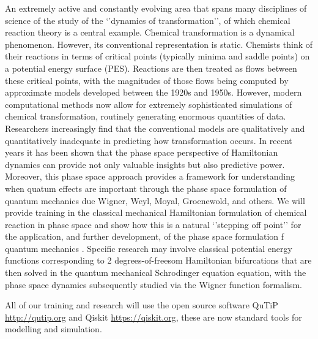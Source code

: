 \documentclass[11pt]{article}
\begin{document}
An extremely active and constantly evolving area that spans many disciplines of science of the study of the ‘’dynamics of transformation’’, of which chemical reaction theory is a central example. Chemical transformation is a dynamical phenomenon.  However, its conventional representation is static.  Chemists think of their reactions in terms of critical points (typically minima and saddle points) on a potential energy surface (PES).  Reactions are then treated as flows between these critical points, with the magnitudes of those flows being computed by approximate models developed between the 1920s and 1950s.  However, modern computational methods now allow for extremely sophisticated simulations of chemical transformation, routinely generating enormous quantities of data. Researchers increasingly find that the conventional models are qualitatively and quantitatively inadequate in predicting how transformation occurs. In recent years it has been shown that the phase space perspective of Hamiltonian dynamics can provide not only valuable insights but also predictive power. Moreover, this phase space approach provides a framework for understanding when quatum effects are important through the phase space formulation of quantum mechanics due Wigner, Weyl, Moyal, Groenewold, and others. We will provide training in the classical mechanical Hamiltonian formulation of chemical reaction in phase space \cite{agaoglou_chemical_2019} and show how this is a natural ‘’stepping off point’’ for the application, and further development, of the phase space formulation f quantum mechanics \cite{ waalkens2007wigner}. Specific research may involve classical potential energy functions corresponding to 2 degrees-of-freesom Hamiltonian bifurcations that are then solved in the quantum mechanical Schr\”odinger equation equation, with the phase space dynamics subsequently studied via the Wigner function formalism.

All of our training and research will use the open source software QuTiP \url{http://qutip.org} and Qiskit \url{https://qiskit.org}, these are now standard tools for modelling and simulation.

\medskip
\end{document}
